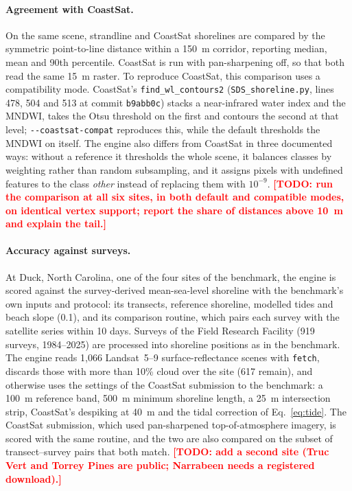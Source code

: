 \documentclass[authoryear,preprint,review,12pt]{elsarticle}
\newcommand{\todo}[1]{\textcolor{red}{\textbf{[TODO: #1]}}}
\begin{document}
\paragraph{Agreement with CoastSat.} On the same scene, strandline and CoastSat
shorelines are compared by the symmetric point-to-line distance within a
150~m corridor, reporting median, mean and 90th percentile. CoastSat is run
with pan-sharpening off, so that both read the same 15~m raster. To reproduce
CoastSat, this comparison uses a compatibility mode. CoastSat's
\texttt{find\_wl\_contours2} (\texttt{SDS\_shoreline.py}, lines 478, 504 and 513
at commit \texttt{b9abb0c}) stacks a near-infrared water index and the MNDWI,
takes the Otsu threshold on the first and contours the second at that level;
\texttt{-{}-coastsat-compat} reproduces this, while the default thresholds the
MNDWI on itself. The engine also differs from CoastSat in three documented ways:
without a reference it thresholds the whole scene, it balances classes by
weighting rather than random subsampling, and it assigns pixels with undefined
features to the class \emph{other} instead of replacing them with $10^{-9}$.
\todo{run the comparison at all six sites, in both default and compatible
modes, on identical vertex support; report the share of distances above 10~m
and explain the tail.}

\paragraph{Accuracy against surveys.} At Duck, North Carolina, one of the four
sites of the \citet{vos2023benchmark} benchmark, the engine is scored against
the survey-derived mean-sea-level shoreline with the benchmark's own inputs and
protocol: its transects, reference shoreline, modelled tides and beach slope
(0.1), and its comparison routine, which pairs each survey with the satellite
series within 10 days. Surveys of the Field Research Facility (919 surveys,
1984--2025) are processed into shoreline positions as in the benchmark. The
engine reads 1,066 Landsat~5--9 surface-reflectance scenes with \texttt{fetch},
discards those with more than 10\% cloud over the site (617 remain), and
otherwise uses the settings of the CoastSat submission to the benchmark: a
100~m reference band, 500~m minimum shoreline length, a 25~m intersection
strip, CoastSat's despiking at 40~m and the tidal correction of
Eq.~\ref{eq:tide}. The CoastSat submission, which used pan-sharpened
top-of-atmosphere imagery, is scored with the same routine, and the two are
also compared on the subset of transect--survey pairs that both match.
\todo{add a second site (Truc Vert and Torrey Pines are public; Narrabeen needs
a registered download).}
\end{document}
